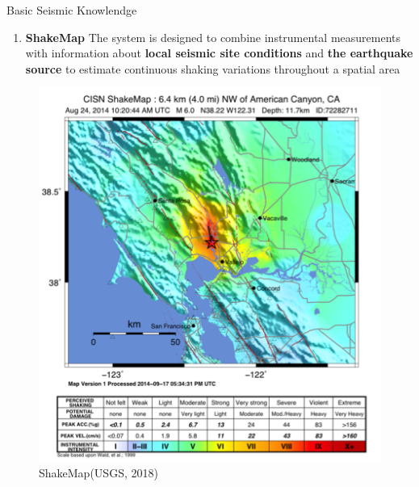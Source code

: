 \documentclass{beamer}
\newcounter{saveenumi}
\newcommand{\conti}{\setcounter{enumi}{\value{saveenumi}}}
\begin{document}
	\begin{frame}[t]{Basic Seismic Knowlendge}
		\begin{enumerate}
			\conti
			\item \textbf{ShakeMap} The system is designed to combine instrumental measurements with information about \textbf{local seismic site conditions} and \textbf{the earthquake source} to estimate continuous shaking variations throughout a spatial area

		\end{enumerate}
		\begin{figure}
			\centering
			\includegraphics[scale=0.5]{example.png}
			\caption{ShakeMap(USGS, 2018)}
		\end{figure}
		
	\end{frame}
\end{document}
